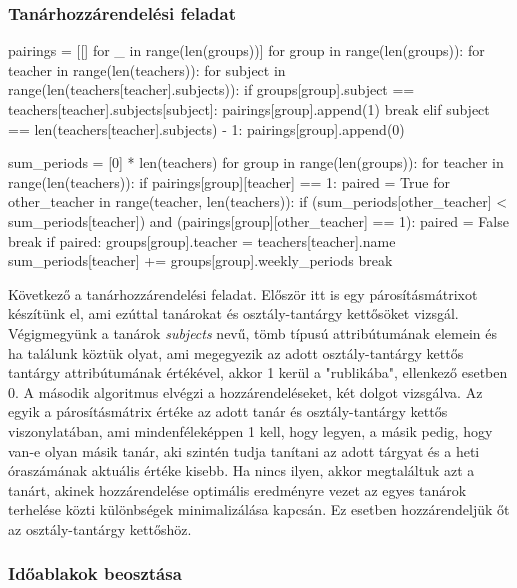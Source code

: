 \documentclass[12pt,a4paper]{report}
\begin{document}
\subsubsection{Tanárhozzárendelési feladat}

\begin{python}
pairings = [[] for _ in range(len(groups))]
for group in range(len(groups)):
    for teacher in range(len(teachers)):
        for subject in range(len(teachers[teacher].subjects)):
            if groups[group].subject == teachers[teacher].subjects[subject]:
                pairings[group].append(1)
                break
            elif subject == len(teachers[teacher].subjects) - 1:
                pairings[group].append(0)

sum_periods = [0] * len(teachers)
for group in range(len(groups)):
    for teacher in range(len(teachers)):
        if pairings[group][teacher] == 1:
            paired = True
            for other_teacher in range(teacher, len(teachers)):
                if (sum_periods[other_teacher] < sum_periods[teacher]) and (pairings[group][other_teacher] == 1):
                    paired = False
                    break
            if paired:
                groups[group].teacher = teachers[teacher].name
                sum_periods[teacher] += groups[group].weekly_periods
                break
\end{python}

Következő a tanárhozzárendelési feladat. Először itt is egy párosításmátrixot készítünk el, ami ezúttal tanárokat és osztály-tantárgy kettősöket vizsgál. Végigmegyünk a tanárok \textsl{subjects} nevű, tömb típusú attribútumának elemein és ha találunk köztük olyat, ami megegyezik az adott osztály-tantárgy kettős tantárgy attribútumának értékével, akkor 1 kerül a "rublikába", ellenkező esetben 0.
A második algoritmus elvégzi a hozzárendeléseket, két dolgot vizsgálva. Az egyik a párosításmátrix értéke az adott tanár és osztály-tantárgy kettős viszonylatában, ami mindenféleképpen 1 kell, hogy legyen, a másik pedig, hogy van-e olyan másik tanár, aki szintén tudja tanítani az adott tárgyat és a heti óraszámának aktuális értéke kisebb. Ha nincs ilyen, akkor megtaláltuk azt a tanárt, akinek hozzárendelése optimális eredményre vezet az egyes tanárok terhelése közti különbségek minimalizálása kapcsán. Ez esetben hozzárendeljük őt az osztály-tantárgy kettőshöz.

\subsubsection{Időablakok beosztása}
\end{document}
